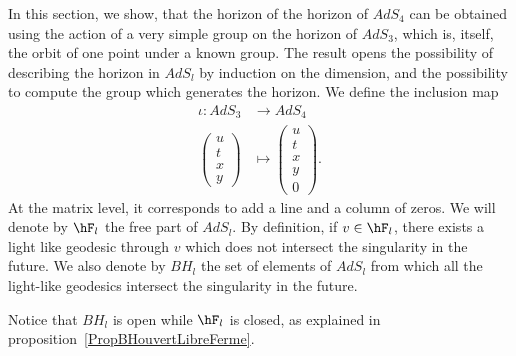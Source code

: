 	In this section, we show, that the horizon of the horizon of $AdS_4$ can be obtained using the action of a very simple group on the horizon of $AdS_3$, which is, itself, the orbit of one point under a known group. The result opens the possibility of describing the horizon in $AdS_l$ by induction on the dimension, and the possibility to compute the group which generates the horizon.  We define the inclusion map
	\begin{equation}
		\begin{aligned}
			\iota\colon AdS_3 & \to AdS_4            \\
			\begin{pmatrix}
				u \\
				t \\
				x \\
				y
			\end{pmatrix}   & \mapsto \begin{pmatrix}
				                          u \\
				                          t \\
				                          x \\
				                          y \\
				                          0
			                          \end{pmatrix}.
		\end{aligned}
	\end{equation}
	At the matrix level, it corresponds to add a line and a column of zeros. We will denote by $\hF_l$ the free part of $AdS_l$. By definition, if $v\in\hF_l$, there exists a light like geodesic through $v$ which does not intersect the singularity in the future. We also denote by $BH_l$ the set of elements of $AdS_l$ from which all the light-like geodesics intersect the singularity in the future.

	Notice that $BH_l$ is open while $\hF_l$ is closed, as explained in proposition~\ref{PropBHouvertLibreFerme}.

